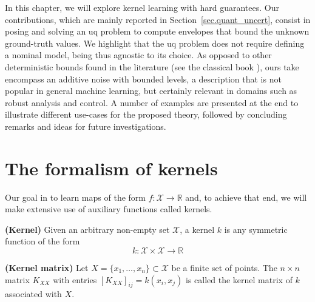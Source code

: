 In this chapter, we will explore kernel learning with hard guarantees. Our contributions, which are mainly reported in Section~\ref{sec.quant_uncert}, consist in posing and solving an \ac{uq} problem to compute envelopes that bound the unknown ground-truth values. We highlight that the \ac{uq} problem does not require defining a nominal model, being thus agnostic to its choice. As opposed to other deterministic bounds found in the literature (see the classical book \citep[§11]{wendland2004scattered}), ours take encompass an additive noise with bounded levels, a description that is not popular in general machine learning, but certainly relevant in domains such as robust analysis and control. A number of examples are presented at the end to illustrate different use-cases for the proposed theory, followed by concluding remarks and ideas for future investigations.


\section{The formalism of kernels}
\label{sec.formalism_of_kernels}

Our goal in to learn maps of the form $f: \mathcal{X} \rightarrow \mathbb{R}$ and, to achieve that end, we will make extensive use of auxiliary functions called kernels.

\begin{definition}
	\textbf{(Kernel)} Given an arbitrary non-empty set $\mathcal{X}$, a kernel $k$ is any symmetric function of the form
	\begin{equation}
		k: \mathcal{X} \times \mathcal{X} \rightarrow \mathbb{R}
	\end{equation}
\end{definition}

\begin{definition}
	\textbf{(Kernel matrix)} Let $X = \{x_1,\dots,x_n\} \subset \mathcal{X}$ be a finite set of points. The $n \times n$ matrix $K_{XX}$ with entries $[K_{XX}]_{ij} = k(x_i,x_j)$ is called the kernel matrix of $k$ associated with $X$.
\end{definition}

